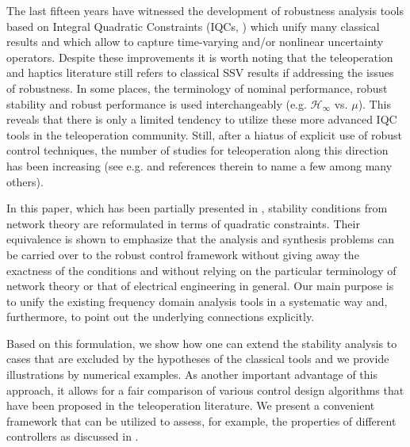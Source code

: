 The last fifteen years have witnessed the development of robustness analysis tools based on Integral Quadratic Constraints (IQCs, \cite{megretski}) which unify many classical results and which allow to capture time-varying and/or nonlinear uncertainty operators. Despite these improvements it is worth noting that the teleoperation and haptics literature still {refers to} classical SSV results if addressing the issues of robustness. In some places, the terminology of nominal performance, robust stability and robust performance is used interchangeably (e.g. $\mathcal{H}_\infty$ vs. $\mu$). This reveals that there is only a limited tendency to utilize these more advanced IQC tools in the teleoperation community. Still, after a hiatus of explicit use of robust control techniques, the number of studies for teleoperation along this direction has been increasing (see e.g. \cite{poorten, boukhnifer, naghsh,kimcavusoglu} and references therein to name a few among many others).

In this paper, which has been partially presented in \cite{polatACC11,polatIFAC11,polatWH11}, stability conditions from network theory are reformulated in terms of quadratic constraints. Their equivalence is shown to emphasize that the analysis and synthesis problems can be carried over to the robust control framework without giving away the exactness of the conditions and without relying on the particular terminology of network theory or that of electrical engineering in general. Our main purpose is to unify the existing frequency domain analysis tools in a systematic way and, furthermore, to point out the underlying connections explicitly.


Based on this formulation, we show how one can extend the stability analysis to cases that are excluded by the hypotheses of the classical tools and we provide illustrations by numerical examples. As another important advantage of this approach, it allows for a fair comparison of various control design algorithms that have been proposed in the teleoperation literature. We present a convenient framework that can be utilized to assess, for example, the properties of different controllers as discussed in \cite{hzaadsalcu,rodriseda}.


